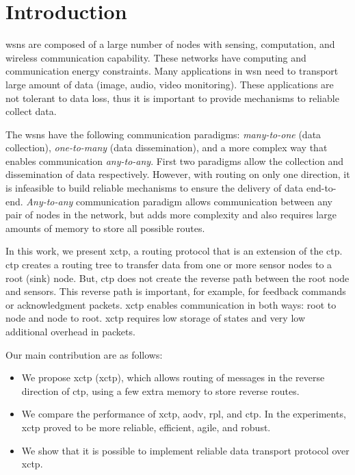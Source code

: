 \section{Introduction}
\label{sec:introduction}


\acp{wsn} are composed of a large number of nodes with sensing, computation, and wireless communication capability. These networks have computing and communication energy constraints. Many applications in \ac{wsn} need to transport large amount of data (image, audio, video monitoring). These applications are not tolerant to data loss, thus it is important to provide mechanisms to reliable collect data.

The \acp{wsn} have the following communication paradigms: \textit{many-to-one} (data collection), \textit{one-to-many} (data dissemination), and a more complex way that enables communication \textit{any-to-any}. First two paradigms allow the collection and dissemination of data respectively. However, with routing on only one direction, it is infeasible to build reliable mechanisms to ensure the delivery of data end-to-end. \textit{Any-to-any} communication paradigm allows communication between any pair of nodes in the network, but adds more complexity and also requires large amounts of memory to store all possible routes.

In this work, we present \acf{xctp}, a routing protocol that is an extension of the \ac{ctp}. \ac{ctp} creates a routing tree to transfer data from one or more sensor nodes to a root (sink) node. But, \ac{ctp} does not create the reverse path between the root node and sensors. This reverse path is important, for example, for feedback commands or acknowledgment packets. \ac{xctp} enables communication in both ways: root to node and node to root. \ac{xctp} requires low storage of states and very low additional overhead in packets.

Our main contribution are as follows:
\begin{itemize}
     \item We propose \acl{xctp} (\ac{xctp}), which allows routing of messages in the reverse direction of \ac{ctp}, using a few extra memory to store reverse routes.
     \item We compare the performance of \ac{xctp}, \ac{aodv}, \ac{rpl}, and \ac{ctp}. In the experiments, \ac{xctp} proved to be more reliable, efficient, agile, and robust.
     \item We show that it is possible to implement reliable data transport protocol over \ac{xctp}.
\end{itemize}

